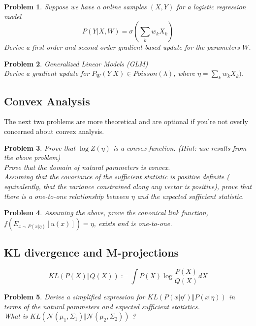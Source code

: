 \documentclass[a4paper]{article}
\newtheorem{problem}{Problem}[section]
\begin{document}
\begin{problem}
  Suppose we have a online samples ${(X,Y)}$ for a logistic regression model
  \begin{equation}
    P( Y \vert X, W) = \sigma( \sum_k w_k X_k )
    \label{logistic}
  \end{equation}
  Derive a first order and second order gradient-based update for the parameters $W$.
\end{problem}

\begin{problem} Generalized Linear Models (GLM) \\
  Derive a gradient update for $P_W( Y \vert X) \in Poisson(\lambda) $, where $\eta = \sum_k w_k X_k )$.
\end{problem}

\subsection{Convex Analysis}

The next two problems are more theoretical and are optional if you're not overly concerned about convex analysis.
\begin{problem}
Prove that $ \log Z(\eta)$ is a convex function. 
(Hint: use results from the above problem)  \\
Prove that the domain of natural parameters is convex.  \\
Assuming that the covariance of the sufficient statistic is positive definite ( equivalently, that the variance constrained along any vector is positive), prove that there is a one-to-one relationship between $\eta$ and the expected sufficient statistic.
\end{problem}

\begin{problem}
Assuming the above, prove the canonical link function, $f( E_{ x \sim P( x \vert \eta) } [ u(x) ] ) = \eta $, exists and is one-to-one.
\end{problem}

\subsection{KL divergence and M-projections}

\begin{equation}
  KL \left( P(X) \Vert Q(X) \right) := \int P(X) \log \frac{P(X)}{Q(X)} dX
  \label{KL}
\end{equation}

\begin{problem}
Derive a simplified expression for $ KL\left( P( x \vert \eta') \Vert P( x \vert \eta) \right)$ in terms of the natural parameters and expected sufficient statistics.  \\
What is $ KL\left( \mathcal{N} \left( \mu_1,\Sigma_1 \right) \Vert \mathcal{N} \left( \mu_2, \Sigma_2 \right) \right) $ ?
\end{problem}
\end{document}
